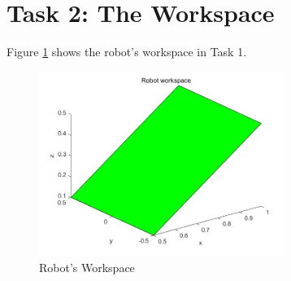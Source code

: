 \section{Task 2: The Workspace}
\FloatBarrier %

Figure \ref{F 3.1} shows the robot's workspace in Task 1.

\begin{figure}[htbp]
    \centering
    \includegraphics[width=8cm]{./fig/workspace.jpg}
    \caption{Robot's Workspace}
    \label{F 3.1}
\end{figure}





